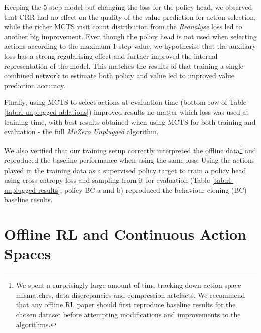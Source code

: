 \documentclass{article}
\newcommand{\reanalyse}{\emph{Reanalyse}}
\newcommand{\mzunplugged}{\emph{MuZero Unplugged}}
\begin{document}
Keeping the 5-step model but changing the loss for the policy head, we observed that CRR had no effect on the quality of the value prediction for action selection, while the richer MCTS visit count distribution from the \reanalyse{} loss led to another big improvement. Even though the policy head is not used when selecting actions according to the maximum 1-step value, we hypothesise that the auxiliary loss has a strong regularising effect and further improved the internal representation of the model. This matches the results of \cite{Silver17AG0} that training a single combined network to estimate both policy and value led to improved value prediction accuracy.

Finally, using MCTS to select actions at evaluation time (bottom row of Table \ref{tab:rl-unplugged-ablations}) improved results no matter which loss was used at training time, with best results obtained when using MCTS for both training and evaluation - the full \mzunplugged{} algorithm.

We also verified that our training setup correctly interpreted the offline data\footnote{We spent a surprisingly large amount of time tracking down action space mismatches, data discrepancies and compression artefacts. We recommend that any offline RL paper should first reproduce baseline results for the chosen dataset before attempting modifications and improvements to the algorithms.} and reproduced the baseline performance when using the same loss: Using the actions played in the training data as a supervised policy target to train a policy head using cross-entropy loss and sampling from it for evaluation (Table \ref{tab:rl-unplugged-results}, policy BC a and b) reproduced the behaviour cloning (BC) baseline results.

\section{Offline RL and Continuous Action Spaces}
\end{document}
